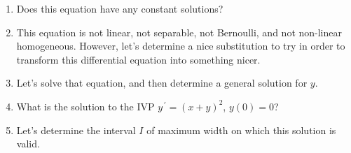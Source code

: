 \documentclass{ximera}
\begin{document}
\begin{enumerate}

\item Does this equation have any constant solutions? 

\vfill


\item This equation is not linear, not separable, not Bernoulli, and not non-linear homogeneous.  However, let's determine a nice substitution to try in order to transform this differential equation into something nicer.

\vfill
\vfill


\item Let's solve that equation, and then determine a general solution for $y$.


\vfill
\vfill


\item What is the solution to the IVP $y^{\,\prime}=(x+y)^2$, $y(0)=0$?


\vfill
\vfill

\item Let's determine the interval $I$ of maximum width on which this solution is valid.

\vspace{1cm}



\end{enumerate}
\end{document}
